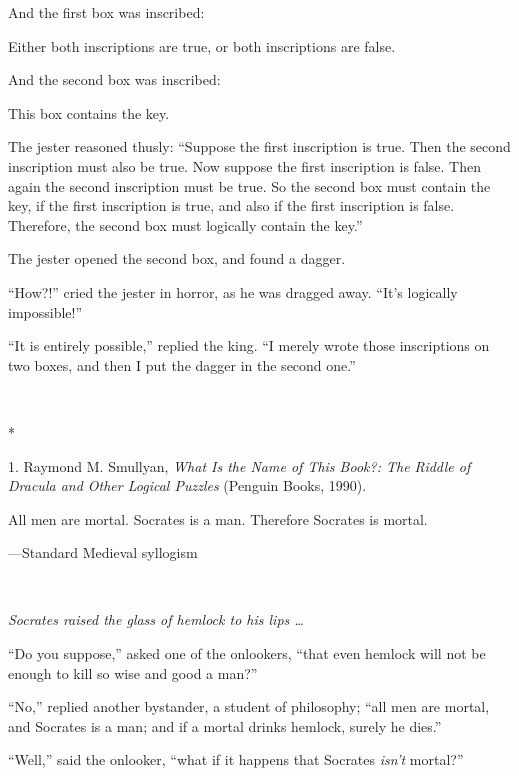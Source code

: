 {
 And the first box was inscribed:}

{
 Either both inscriptions are true, or both inscriptions are
false.}

{
 And the second box was inscribed:}

{
 This box contains the key.}

{
 The jester reasoned thusly: ``Suppose the first
inscription is true. Then the second inscription must also be true. Now
suppose the first inscription is false. Then again the second
inscription must be true. So the second box must contain the key, if
the first inscription is true, and also if the first inscription is
false. Therefore, the second box must logically contain the
key.''}

{
 The jester opened the second box, and found a dagger.}

{
 ``How?!'' cried the jester in
horror, as he was dragged away. ``It's
logically impossible!''}

{
 ``It is entirely possible,''
replied the king. ``I merely wrote those inscriptions
on two boxes, and then I put the dagger in the second
one.''}

{\centering
 \ ~
\par}

{\centering
 *
\par}


\bigskip

{
 1. Raymond M. Smullyan, \textit{What Is the Name of This Book?:
The Riddle of Dracula and Other Logical Puzzles} (Penguin Books,
1990).}


{
 All men are mortal. Socrates is a man. Therefore Socrates is
mortal.}

{\raggedleft
 {}---Standard Medieval syllogism
\par}


\bigskip

{
 ~}

{
 \textit{Socrates raised the glass of hemlock to his lips \ldots}}

{
 ``Do you suppose,'' asked one
of the onlookers, ``that even hemlock will not be
enough to kill so wise and good a man?''}

{
 ``No,'' replied another
bystander, a student of philosophy; ``all men are
mortal, and Socrates is a man; and if a mortal drinks hemlock, surely
he dies.''}

{
 ``Well,'' said the onlooker,
``what if it happens that Socrates
\textit{isn't} mortal?''}

